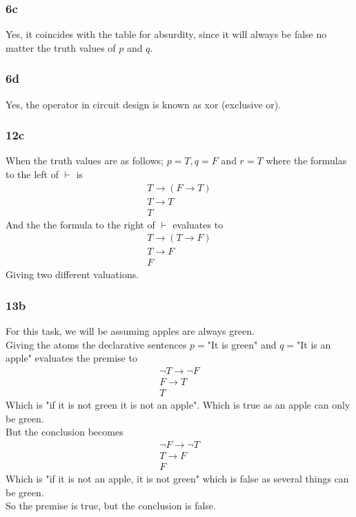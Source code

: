 \documentclass[12pt]{article}
\begin{document}
\subsubsection*{6c}
Yes, it coincides with the table for absurdity, since it will always be false no matter the truth values of $p$ and $q$.

\subsubsection*{6d}
Yes, the operator in circuit design is known as xor (exclusive or).

\subsubsection*{12c}
When the truth values are as follows; $p=T,q=F$ and $r=T$ where the formulas to the left of $\vdash$ is\\
\begin{align*}
T\rightarrow(F\rightarrow T)\\
T\rightarrow T \\
T
\end{align*}
And the the formula to the right of $\vdash$ evaluates to 
\begin{align*}
T\rightarrow(T\rightarrow F)\\
T\rightarrow F \\
F
\end{align*}
Giving two different valuations.

\subsubsection*{13b}
For this task, we will be assuming apples are always green.\\
Giving the atoms the declarative sentences $p=$"It is green" and $q=$"It is an apple" evaluates the premise to
\begin{align*}
\neg T \rightarrow \neg F \\
F \rightarrow T \\
T
\end{align*}
Which is "if it is not green it is not an apple". Which is true as an apple can only be green.\\
But the conclusion becomes
\begin{align*}
\neg F\rightarrow \neg T \\
T \rightarrow F \\
F
\end{align*}
Which is "if it is not an apple, it is not green" which is false as several things can be green.\\
So the premise is true, but the conclusion is false.
\end{document}
